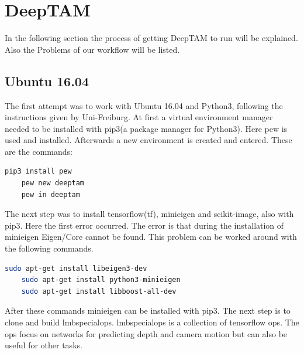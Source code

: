 \section{DeepTAM\authorB}
In the following section the process of getting DeepTAM to run will be explained. Also the Problems of our workflow will be listed.

\subsection{Ubuntu 16.04}

The first attempt was to work with Ubuntu 16.04 and Python3, following the instructions given by Uni-Freiburg. At first a virtual environment manager needed to be installed with pip3(a package manager for Python3). Here pew is used and installed. Afterwards a new environment is created and entered. These are the commands:  

\begin{lstlisting}[language=bash]
    pip3 install pew
    pew new deeptam
    pew in deeptam
\end{lstlisting}

The next step was to install tensorflow(\gls{tf}), minieigen and scikit-image, also with pip3. Here the first error occurred. The error is that during the installation of minieigen Eigen/Core cannot be found. This problem can be worked around with the following commands.

\begin{lstlisting}[language=bash]
    sudo apt-get install libeigen3-dev
    sudo apt-get install python3-minieigen 
    sudo apt-get install libboost-all-dev
\end{lstlisting}

After these commands minieigen can be installed with pip3. The next step is to clone and build lmbspecialops. lmbspecialops is a collection of tensorflow ops. The ops focus on networks for predicting depth and camera motion but can also be useful for other tasks. 
